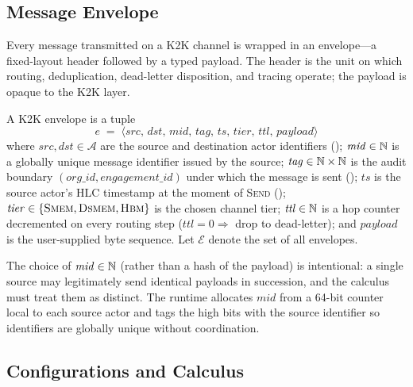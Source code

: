 \subsection{Message Envelope}
\label{sec:k2k:envelope}

Every message transmitted on a K2K channel is wrapped in an
envelope—a fixed-layout header followed by a typed payload.  The
header is the unit on which routing, deduplication, dead-letter
disposition, and tracing operate; the payload is opaque to the K2K
layer.

\begin{definition}[K2K Envelope]
\label{def:k2k-envelope}
A K2K envelope is a tuple
\[
  e \;=\;
  \langle \mathit{src},\,
          \mathit{dst},\,
          \mathit{mid},\,
          \mathit{tag},\,
          \mathit{ts},\,
          \mathit{tier},\,
          \mathit{ttl},\,
          \mathit{payload} \rangle
\]
where \(\mathit{src}, \mathit{dst} \in \mathcal{A}\) are the source
and destination actor identifiers ();
\(\mathit{mid} \in \mathbb{N}\) is a globally unique message identifier
issued by the source;
\(\mathit{tag} \in \mathbb{N} \times \mathbb{N}\) is the audit boundary
\((\mathit{org\_id}, \mathit{engagement\_id})\) under which the
message is sent ();
\(\mathit{ts}\) is the source actor's HLC timestamp at the moment of
\textsc{Send} ();
\(\mathit{tier} \in \{\textsc{Smem}, \textsc{Dsmem}, \textsc{Hbm}\}\)
is the chosen channel tier;
\(\mathit{ttl} \in \mathbb{N}\) is a hop counter decremented on every routing
step (\(\mathit{ttl} = 0 \Rightarrow\) drop to dead-letter); and
\(\mathit{payload}\) is the user-supplied byte sequence.  Let
\(\mathcal{E}\) denote the set of all envelopes.
\end{definition}

The choice of \(\mathit{mid} \in \mathbb{N}\) (rather than a hash of the
payload) is intentional: a single source may legitimately send
identical payloads in succession, and the calculus must treat them
as distinct.  The runtime allocates \(\mathit{mid}\) from a 64-bit
counter local to each source actor and tags the high bits with the
source identifier so identifiers are globally unique without
coordination.

\subsection{Configurations and Calculus}
\label{sec:k2k:calculus}

